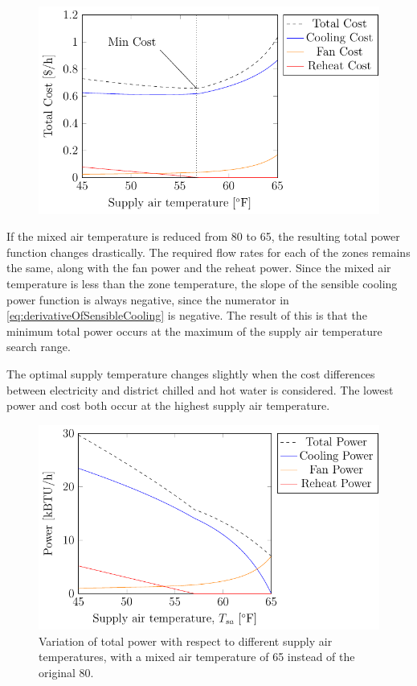 \begin{figure}
\centering
\includegraphics{Plots/35-SimplifiedExampleCostHighMAT/simplifiedExampleCostHighMAT.pdf}
\caption{}
\label{fig:simplifiedExampleCost}
\end{figure}


If the mixed air temperature is reduced from \SI{80}{\degreeF} to
\SI{65}{\degreeF}, the resulting total power function changes
drastically. The required flow rates for each of the zones remains the
same, along with the fan power and the reheat power. Since the mixed air
temperature is less than the zone temperature, the slope of the sensible
cooling power function is always negative, since the numerator in
 \ref{eq:derivativeOfSensibleCooling} is negative. The
result of this is that the minimum total power occurs at the maximum of
the supply air temperature search range.   

The optimal supply temperature changes slightly when the cost
differences between electricity and district chilled and hot water is
considered. The lowest power and cost both occur at the highest supply air
temperature. 

\newcommand{\variationCaptionLowMAT}[1]{Variation of total #1 with respect to different supply air
temperatures, with a mixed air temperature of \SI{65}{\degreeF} instead
of the original \SI{80}{\degreeF}.}

\begin{figure}
\centering
\includegraphics{Plots/34-SimplifiedExampleLowerMAT/simplifiedExampleLowerMAT.pdf}
\caption{\variationCaptionLowMAT{power}}
\label{fig:simplifiedExamplePowerLowerMAT}
\end{figure}

